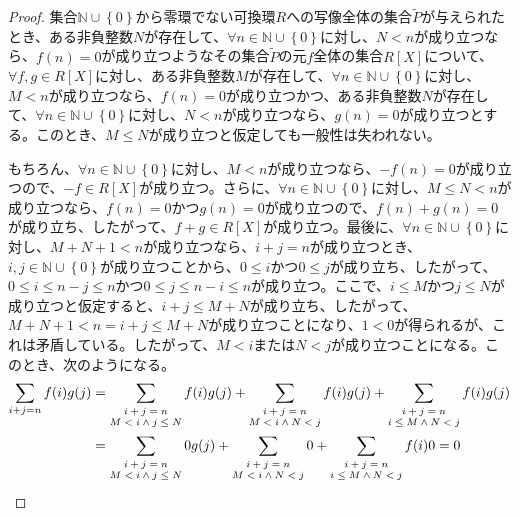 \documentclass[dvipdfmx]{jsarticle}
\begin{document}
\begin{proof}
集合$\mathbb{N} \cup \left\{ 0 \right\}$から零環でない可換環$R$への写像全体の集合$\widetilde{P}$が与えられたとき、ある非負整数$N$が存在して、$\forall n \in \mathbb{N} \cup \left\{ 0 \right\}$に対し、$N < n$が成り立つなら、$f(n) = 0$が成り立つようなその集合$\widetilde{P}$の元$f$全体の集合$R[ X]$について、$\forall f,g \in R[ X]$に対し、ある非負整数$M$が存在して、$\forall n \in \mathbb{N} \cup \left\{ 0 \right\}$に対し、$M < n$が成り立つなら、$f(n) = 0$が成り立つかつ、ある非負整数$N$が存在して、$\forall n \in \mathbb{N} \cup \left\{ 0 \right\}$に対し、$N < n$が成り立つなら、$g(n) = 0$が成り立つとする。このとき、$M \leq N$が成り立つと仮定しても一般性は失われない。\par
もちろん、$\forall n \in \mathbb{N} \cup \left\{ 0 \right\}$に対し、$M < n$が成り立つなら、$- f(n) = 0$が成り立つので、$- f \in R[ X]$が成り立つ。さらに、$\forall n \in \mathbb{N} \cup \left\{ 0 \right\}$に対し、$M \leq N < n$が成り立つなら、$f(n) = 0$かつ$g(n) = 0$が成り立つので、$f(n) + g(n) = 0$が成り立ち、したがって、$f + g \in R[ X]$が成り立つ。最後に、$\forall n \in \mathbb{N} \cup \left\{ 0 \right\}$に対し、$M + N + 1 < n$が成り立つなら、$i + j = n$が成り立つとき、$i,j \in \mathbb{N} \cup \left\{ 0 \right\}$が成り立つことから、$0 \leq i$かつ$0 \leq j$が成り立ち、したがって、$0 \leq i \leq n - j \leq n$かつ$0 \leq j \leq n - i \leq n$が成り立つ。ここで、$i \leq M$かつ$j \leq N$が成り立つと仮定すると、$i + j \leq M + N$が成り立ち、したがって、$M + N + 1 < n = i + j \leq M + N$が成り立つことになり、$1 < 0$が得られるが、これは矛盾している。したがって、$M < i$または$N < j$が成り立つことになる。このとき、次のようになる。
\begin{align*}
\sum_{i + j = n} {f(i)g(j)} &= \sum_{\scriptsize \begin{matrix} i + j = n \\M < i \land j \leq N \end{matrix}} {f(i)g(j)} + \sum_{\scriptsize \begin{matrix} i + j = n \\M < i \land N < j \end{matrix}} {f(i)g(j)} + \sum_{\scriptsize \begin{matrix} i + j = n \\i \leq M \land N < j \end{matrix}} {f(i)g(j)}\\
&= \sum_{\scriptsize \begin{matrix} i + j = n \\M < i \land j \leq N \end{matrix}} {0g(j)} + \sum_{\scriptsize \begin{matrix} i + j = n \\M < i \land N < j \end{matrix}} 0 + \sum_{\scriptsize \begin{matrix} i + j = n \\i \leq M \land N < j \end{matrix}} {f(i)0} = 0

\end{align*}
\end{proof}
\end{document}
